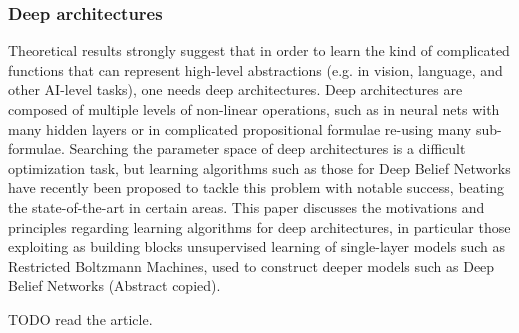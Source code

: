 \subsubsection{Deep architectures}
Theoretical results strongly suggest that in order to learn the kind of complicated functions that can represent high-level abstractions (e.g. in vision, language, and other AI-level tasks), one needs deep architectures. Deep architectures are composed of multiple levels of non-linear operations, such as in neural nets with many hidden layers or in complicated propositional formulae re-using many sub-formulae. Searching the parameter space of deep architectures is a difficult optimization task, but learning algorithms such as those for Deep Belief Networks have recently been proposed to tackle this problem with notable success, beating the state-of-the-art in certain areas. This paper discusses the motivations and principles regarding learning algorithms for deep architectures, in particular those exploiting as building blocks unsupervised learning of single-layer models such as Restricted Boltzmann Machines, used to construct deeper models such as Deep Belief Networks \cite{bengio2009learning} (Abstract copied).

TODO read the article. 
